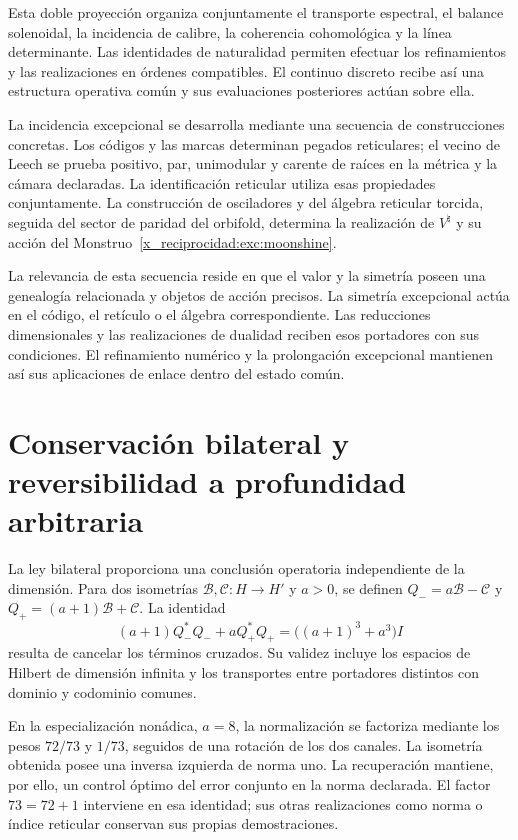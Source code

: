 Esta doble proyección organiza conjuntamente el transporte
espectral, el balance solenoidal, la incidencia de calibre,
la coherencia cohomológica y la línea determinante. Las
identidades de naturalidad permiten efectuar los refinamientos
y las realizaciones en órdenes compatibles. El continuo
discreto recibe así una estructura operativa común y sus
evaluaciones posteriores actúan sobre ella.

La incidencia excepcional se desarrolla mediante una secuencia
de construcciones concretas. Los códigos y las marcas determinan
pegados reticulares; el vecino de Leech se prueba positivo,
par, unimodular y carente de raíces en la métrica y la cámara
declaradas. La identificación reticular utiliza esas propiedades
conjuntamente. La construcción de osciladores y del álgebra
reticular torcida, seguida del sector de paridad del orbifold,
determina la realización de \(V^\natural\) y su acción del
Monstruo~\ref{x_reciprocidad:exc:moonshine}.

La relevancia de esta secuencia reside en que el valor y la
simetría poseen una genealogía relacionada y objetos de acción
precisos. La simetría excepcional actúa en el código, el
retículo o el álgebra correspondiente. Las reducciones
dimensionales y las realizaciones de dualidad reciben esos
portadores con sus condiciones. El refinamiento numérico y
la prolongación excepcional mantienen así sus aplicaciones
de enlace dentro del estado común.

\section{Conservación bilateral y reversibilidad a profundidad arbitraria}

La ley bilateral proporciona una conclusión operatoria
independiente de la dimensión. Para dos isometrías
\(\mathcal B,\mathcal C:H\to H'\) y \(a>0\), se definen
\(Q_-=a\mathcal B-\mathcal C\) y
\(Q_+=(a+1)\mathcal B+\mathcal C\). La identidad
\[
 (a+1)Q_-^*Q_-+aQ_+^*Q_+
 =\bigl((a+1)^3+a^3\bigr)I
\]
resulta de cancelar los términos cruzados. Su validez incluye
los espacios de Hilbert de dimensión infinita y los transportes
entre portadores distintos con dominio y codominio comunes.

En la especialización nonádica, \(a=8\), la normalización se
factoriza mediante los pesos \(72/73\) y \(1/73\), seguidos
de una rotación de los dos canales. La isometría obtenida posee
una inversa izquierda de norma uno. La recuperación mantiene,
por ello, un control óptimo del error conjunto en la norma
declarada. El factor \(73=72+1\) interviene en esa identidad;
sus otras realizaciones como norma o índice reticular conservan
sus propias demostraciones.

